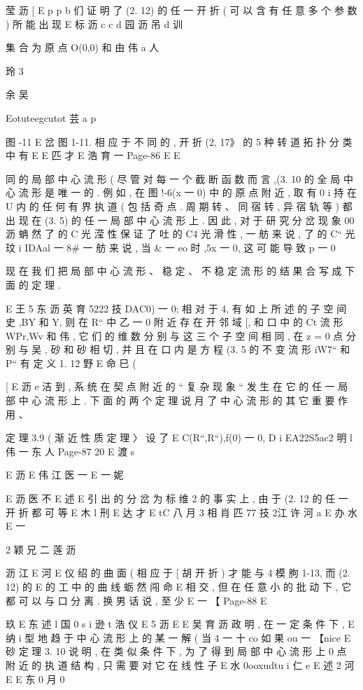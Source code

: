 {{{莹 沥 [
E p p b
们 证 明 了 (2. 12) 的 任 一 开 折 ( 可 以 含 有 任 意 多 个 参 数 ) 所 能 出 现
E 标 沥
c
c d
园 沥 吊 d 训

集 合 为 原 点 O(0,0) 和 由
伟 a 人

玲
3

余 吴

Eotuteegcutot 芸 a p

图 -11 E
岔 图 1-11. 相 应 于 不 同 的 , 开 折 (2, 17》 的 5 种 转 道 拓 扑 分 类 中 有
E
E 匹 才
E 浩 育 一
Page-86
E E

同 的 局 部 中 心 流 形 ( 尽 管 对 每 一 个 截 断 函 数 而 言 ,(3. 10 的 全 局
中 心 流 形 是 唯 一 的 . 例 如 , 在 图 !-6(x 一 0) 中 的 原 点 附 近 , 取 有
0
i
持 在 U 内 的 任 何 有 界 执 道 ( 包 括 奇 点 . 周 期 转 、 同 宿 转 , 异 宿 轨 等 )
都 出 现 在 (3. 5) 的 任 一 局 部 中 心 流 形 上 . 因 此 , 对 于 研 究 分 岔 现 象
00 沥
蚺 然 了 的 C 光 滢 性 保 证 了 吐 的 C4 光 滑 性 , 一 舫 来 说 , 了 的 C“ 光
玟
i
IDAal 一 8# 一 舫 来 说 , 当 & 一 eo 时 ,5x 一 0, 这 可 能 导 致 p 一 0

现 在 我 们 把 局 部 中 心 流 形 、 稳 定 、 不 稳 定 流 形 的 结 果 合 写 成 下
面 的 定 理 .

E 王 5 东 沥 英 育 5222 技
DAC0) 一 0; 相 对 于 4, 有 如 上 所 述 的 子 空 间 史 ,BY 和 Y, 则 在 R“
中 乙 一 0 附 近 存 在 开 邻 域 [, 和 口 中 的 Ct 流 形 WPr,Wv 和 伟 , 它 们
的 维 数 分 别 与 这 三 个 子 空 间 相 同 , 在 z = 0 点 分 别 与 吴 , 砂 和 砂
相 切 , 并 且 在 口 内 是 方 程 (3. 5 的 不 变 流 形 iW7“ 和 P“ 有 定 义 1. 12
野
E 命 巳 (

[
E 沥 e 洁
到 , 系 统 在 契 点 附 近 的 “ 复 杂 现 象 “ 发 生 在 它 的 任 一 局 部 中 心 流 形
上 . 下 面 的 两 个 定 理 说 月 了 中 心 流 形 的 其 它 重 要 作 用 、

定 理 3.9 ( 渐 近 性 质 定 理 〉 设 了 E C(R“,R“),f(0) 一 0,
D
i
EA22S5ac2 明 l 伟 一 东 人
Page-87
20 E 渡 s

E 沥
E 伟 江 医 一
E 一
妮

E 沥 医 不
E 述 E
引 出 的 分 岔 为 标 维 2 的 事 实 上 , 由 于 (2. 12 的 任 一 开 折 都 可 等
E 木
l 刑
E 达 才
E
tC 八 月 3 相 肖 匹 77 技 2江 许 河 a E 办 水
E 一

2 颖 兄 二 莲 沥

沥 江
E
河
E 仪
绍 的 曲 面 ( 相 应 于
[ 胡
开 折 ) 才 能 与 4 模
朐
1-13, 而 (2. 12) 的
E
的 工 中 的 曲 线 蛎 然 闯 命
E
相 交 , 但 在 任 意 小 的 批 动 下 , 它 都 可 以 与 口 分 离 . 换 男 话 说 , 至 少
E 一
【
Page-88
E

玖
E 东 述 l 国
0 s i 逊 t 浩 仪
E 5 沥
E
E 吴 育 沥 政
明 , 在 一 定 条 件 下 ,
E
纳
i
型 地 趋 于 中 心 流 形
上 的 某 一 解 ( 当 4
一 十 co 如 果 ou 一
【nice
E 砂
定 理 3. 10 说 明 , 在
类 似 条 件 下 , 为 了
得 到 局 部 中 心 流 形 上 0 点 附 近 的 执 道 结 构 , 只 需 要 对 它 在 线 性 子
E 水
0ooxudtu i 仁 e
E 述 2 河
E
E 东 0 月 0

}}}
